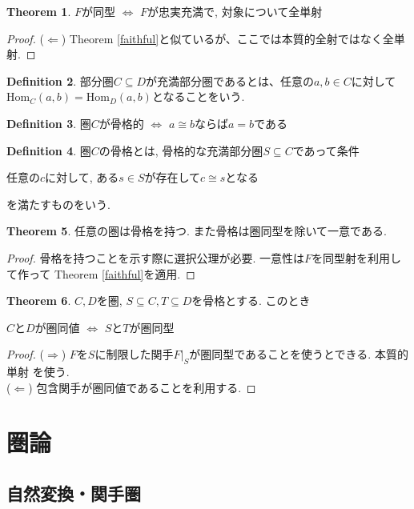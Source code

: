 \documentclass[a4paper,10pt]{article}
\theoremstyle{definition}
\newtheorem{thm}{\bfseries Theorem}[section]
\newtheorem{definition}[thm]{\bfseries Definition}
\begin{document}
\begin{thm}
    $F$が同型 $\Longleftrightarrow$
    $F$が忠実充満で, 対象について全単射
\end{thm}
\begin{proof}
($\Longleftarrow$) Theorem \ref{faithful}と似ているが、ここでは本質的全射ではなく全単射.
\end{proof}
\begin{definition}
    部分圏$C \subseteq D$が充満部分圏であるとは、任意の$a, b\in C$に対して
    $\textrm{Hom}_{C}(a,b) = \textrm{Hom}_{D}(a,b)$となることをいう.
\end{definition}
\begin{definition}
    圏$C$が骨格的 $\Longleftrightarrow$ $a \cong b$ならば$a=b$である
\end{definition}
\begin{definition}
    圏$C$の骨格とは, 骨格的な充満部分圏$S \subseteq C$であって条件
    \begin{center}
        任意の$c$に対して, ある$s\in S$が存在して$c \cong s$となる
    \end{center}
    を満たすものをいう.
\end{definition}
\begin{thm}
    任意の圏は骨格を持つ. また骨格は圏同型を除いて一意である.
\end{thm}
\begin{proof}
    骨格を持つことを示す際に選択公理が必要. 一意性は$F$を同型射を利用して作って
    Theorem \ref{faithful}を適用.
\end{proof}
\begin{thm}
    $C, D$を圏, $S \subseteq C, T \subseteq D$を骨格とする. このとき
    \begin{center}
        $C$と$D$が圏同値 $\Longleftrightarrow$ $S$と$T$が圏同型
    \end{center}
\end{thm}
\begin{proof}
    ($\Longrightarrow$) $F$を$S$に制限した関手$F|_S$が圏同型であることを使うとできる. 本質的単射
    を使う.\\
    ($\Longleftarrow$) 包含関手が圏同値であることを利用する.
\end{proof}
\section{圏論}
\subsection{自然変換・関手圏}
\end{document}
